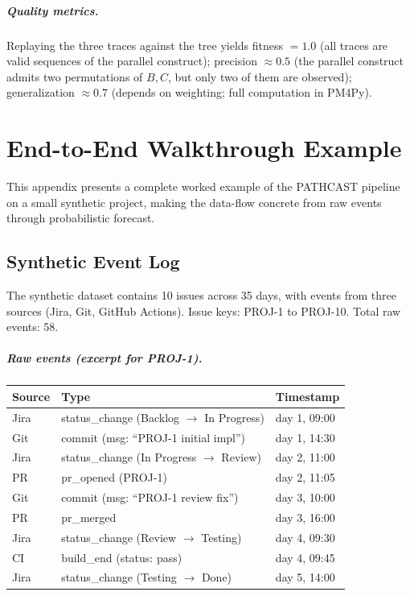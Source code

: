 \paragraph{Quality metrics.} Replaying the three traces against the tree
yields fitness $= 1.0$ (all traces are valid sequences of the parallel
construct); precision $\approx 0.5$ (the parallel construct admits two
permutations of $B, C$, but only two of them are observed); generalization
$\approx 0.7$ (depends on weighting; full computation in PM4Py).


\chapter{End-to-End Walkthrough Example}
\label{app:J}

This appendix presents a complete worked example of the PATHCAST pipeline
on a small synthetic project, making the data-flow concrete from raw
events through probabilistic forecast.


\section{Synthetic Event Log}
\label{app:J-log}

The synthetic dataset contains 10 issues across 35 days, with events from
three sources (Jira, Git, GitHub Actions). Issue keys: PROJ-1 to PROJ-10.
Total raw events: 58.

\paragraph{Raw events (excerpt for PROJ-1).}
\begin{center}
\small
\begin{tabular}{lll}
\toprule
\textbf{Source} & \textbf{Type} & \textbf{Timestamp} \\
\midrule
Jira  & status\_change (Backlog $\to$ In Progress) & day 1, 09:00 \\
Git   & commit (msg: ``PROJ-1 initial impl'')      & day 1, 14:30 \\
Jira  & status\_change (In Progress $\to$ Review)  & day 2, 11:00 \\
PR    & pr\_opened (PROJ-1)                        & day 2, 11:05 \\
Git   & commit (msg: ``PROJ-1 review fix'')        & day 3, 10:00 \\
PR    & pr\_merged                                 & day 3, 16:00 \\
Jira  & status\_change (Review $\to$ Testing)      & day 4, 09:30 \\
CI    & build\_end (status: pass)                  & day 4, 09:45 \\
Jira  & status\_change (Testing $\to$ Done)        & day 5, 14:00 \\
\bottomrule
\end{tabular}
\end{center}

